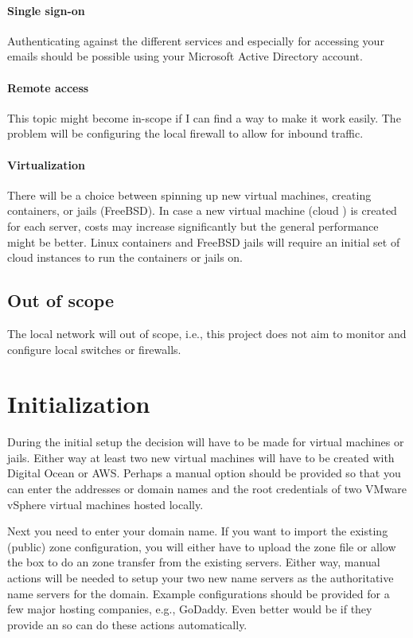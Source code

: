 \documentclass[a4paper,12pt,twoside]{scrartcl}
\begin{document}
\paragraph{Single sign-on}
Authenticating against the different services and especially for accessing your emails should be possible using your Microsoft Active Directory account.

\paragraph{Remote access }
This topic might become in-scope if I can find a way to make it work easily.
The problem will be configuring the local firewall to allow for inbound traffic.

\paragraph{Virtualization}
There will be a choice between spinning up new virtual machines, creating containers, or jails (FreeBSD).
In case a new virtual machine (cloud ) is created for each server, costs may increase significantly but the general performance might be better.
Linux containers and FreeBSD jails will require an initial set of cloud  instances to run the containers or jails on.

\subsection{Out of scope}
The local network will out of scope, i.e., this project does not aim to monitor and configure local switches or firewalls.


\section{Initialization}
\label{sec:initialization}
During the initial setup the decision will have to be made for virtual machines or jails.
Either way at least two new virtual machines will have to be created with Digital Ocean or AWS.
Perhaps a manual option should be provided so that you can enter the  addresses or domain names and the root credentials of two VMware vSphere virtual machines hosted locally.

Next you need to enter your domain name.
If you want to import the existing (public) zone configuration, you will either have to upload the zone file or allow the  box to do an  zone transfer from the existing  servers.
Either way, manual actions will be needed to setup your two new name servers as the authoritative name servers for the domain.
Example configurations should be provided for a few major hosting companies, e.g., GoDaddy.
Even better would be if they provide an  so  can do these actions automatically.
\end{document}
